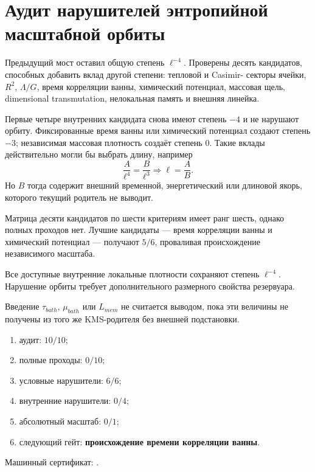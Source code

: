 \chapter{Аудит нарушителей энтропийной масштабной орбиты}
\label{ch:v10-entropy-scale-orbit-breakers}
Предыдущий мост оставил общую степень $\ell^{-4}$. Проверены десять
кандидатов, способных добавить вклад другой степени: тепловой и Casimir-
секторы ячейки, $R^2$, $\Lambda/G$, время корреляции ванны, химический
потенциал, массовая щель, dimensional transmutation, нелокальная память и
внешняя линейка.

Первые четыре внутренних кандидата снова имеют степень $-4$ и не нарушают
орбиту. Фиксированные время ванны или химический потенциал создают степень
$-3$; независимая массовая плотность создаёт степень $0$. Такие вклады
действительно могли бы выбрать длину, например
\begin{equation}\frac{A}{\ell^4}=\frac{B}{\ell^3}
\Longrightarrow \ell=\frac AB.
\end{equation}
Но $B$ тогда содержит внешний временной, энергетический или длиновой якорь,
которого текущий родитель не выводит.

Матрица десяти кандидатов по шести критериям имеет ранг шесть, однако полных
проходов нет. Лучшие кандидаты --- время корреляции ванны и химический
потенциал --- получают $5/6$, проваливая происхождение независимого масштаба.
\begin{theorem}
Все доступные внутренние локальные плотности сохраняют степень $\ell^{-4}$.
Нарушение орбиты требует дополнительного размерного свойства резервуара.
\end{theorem}
\begin{nogocriterion}
Введение $\tau_{bath}$, $\mu_{bath}$ или $L_{mem}$ не считается выводом,
пока эти величины не получены из того же KMS-родителя без внешней подстановки.
\end{nogocriterion}
\begin{protocol}\begin{enumerate}\item аудит: \textbf{$10/10$};\item полные проходы: \textbf{$0/10$};
\item условные нарушители: \textbf{$6/6$};\item внутренние нарушители: \textbf{$0/4$};
\item абсолютный масштаб: \textbf{$0/1$};\item следующий гейт: \textbf{происхождение времени корреляции ванны}.\end{enumerate}\end{protocol}
Машинный сертификат: .